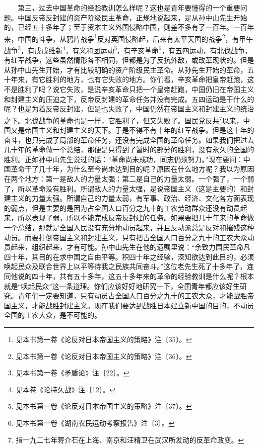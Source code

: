 \documentclass[cn,11pt,chinese]{elegantbook}
\begin{document}
　　第三，过去中国革命的经验教训怎么样呢？这也是青年要懂得的一个重要问题。中国反帝反封建的资产阶级民主革命，正规地说起来，是从孙中山先生开始的，已经五十多年了；至于资本主义外国侵略中国，则差不多有了一百年。一百年来，中国的斗争，从鸦片战争\footnote[3]{ 见本书第一卷《论反对日本帝国主义的策略》注〔35〕。}反对英国侵略起，后来有太平天国的战争\footnote[4]{ 见本书第一卷《论反对日本帝国主义的策略》注〔36〕。}，有甲午战争\footnote[5]{ 见本书第一卷《矛盾论》注〔22〕。}，有戊戌维新\footnote[6]{ 见本卷《论持久战》注〔12〕。}，有义和团运动\footnote[7]{ 见本书第一卷《论反对日本帝国主义的策略》注〔37〕。}，有辛亥革命\footnote[8]{ 见本书第一卷《湖南农民运动考察报告》注〔3〕。}，有五四运动，有北伐战争，有红军战争，这些虽然情形各不相同，但都是为了反抗外敌，或改革现状的。但是从孙中山先生开始，才有比较明确的资产阶级民主革命。从孙先生开始的革命，五十年来，有它胜利的地方，也有它失败的地方。你们看，辛亥革命把皇帝赶跑，这不是胜利了吗？说它失败，是说辛亥革命只把一个皇帝赶跑，中国仍旧在帝国主义和封建主义的压迫之下，反帝反封建的革命任务并没有完成。五四运动是干什么的呢？也是为着反帝反封建，但是也失败了，中国仍然在帝国主义和封建主义的统治之下。北伐战争的革命也是一样，它胜利了，但又失败了。国民党反共\footnote[9]{ 指一九二七年蒋介石在上海、南京和汪精卫在武汉所发动的反革命政变。}以来，中国又是帝国主义和封建主义的天下。于是不得不有十年的红军战争。但是这十年的奋斗，也只完成了局部的革命任务，还没有完成全国的革命任务。如果我们把过去几十年的革命做一个总结，那便是只得到了暂时的部分的胜利，没有永久的全国的胜利。正如孙中山先生说过的话：“革命尚未成功，同志仍须努力。”现在要问：中国革命干了几十年，为什么至今尚未达到目的呢？原因在什么地方呢？我以为原因在两个地方：第一是敌人的力量太强；第二是自己的力量太弱。一个强了，一个弱了，所以革命没有胜利。所谓敌人的力量太强，是说帝国主义（这是主要的）和封建主义的力量太强。所谓自己的力量太弱，有军事、政治、经济、文化各方面表现的弱点，但是主要的是因为占全国人口百分之九十的工农劳动群众还没有动员起来，所以表现了弱，所以不能完成反帝反封建的任务。如果要把几十年来的革命做一个总结，那就是全国人民没有充分地动员起来，并且反动派总是反对和摧残这种动员。而要打倒帝国主义和封建主义，只有把占全国人口百分之九十的工农大众动员起来，组织起来，才有可能。孙中山先生在他的遗嘱里说：“余致力国民革命凡四十年，其目的在求中国之自由平等。积四十年之经验，深知欲达到此目的，必须唤起民众及联合世界上以平等待我之民族共同奋斗。”这位老先生死了十多年了，连同他说的四十年，共有五十多年，这五十多年来的革命的经验教训是什么呢？根本就是“唤起民众”这一条道理。你们应该好好地研究一下，全国青年都应该好生研究。青年们一定要知道，只有动员占全国人口百分之九十的工农大众，才能战胜帝国主义，才能战胜封建主义。现在我们要达到战胜日本建立新中国的目的，不动员全国的工农大众，是不可能的。\\
\end{document}

